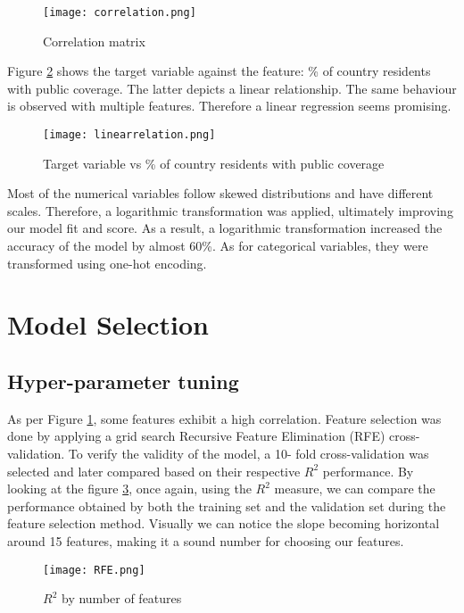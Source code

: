 \documentclass[twocolumn]{article}
\begin{document}
\begin{figure}[h]
    \centering
    \texttt{[image: correlation.png]}
    \caption{Correlation matrix}
    \label{fig:corr}
\end{figure}

Figure \ref{fig:linear} shows the target variable against the feature: \% of country residents with public coverage.  The latter depicts a linear relationship. The same behaviour is observed with multiple features. Therefore a linear regression seems promising.

\begin{figure}[h]
    \centering
    \texttt{[image: linearrelation.png]}
    \caption{Target variable vs \% of country residents with public coverage}
    \label{fig:linear}
\end{figure}

Most of the numerical variables follow skewed distributions and have different scales. Therefore, a logarithmic transformation was applied, ultimately improving our model fit and score. As a result, a logarithmic transformation increased the accuracy of the model by almost 60\%. As for categorical variables, they were transformed using one-hot encoding. 

\section{Model Selection}\label{secmodel}

\subsection{Hyper-parameter tuning} \label{secpar}
As per Figure \ref{fig:corr}, some features exhibit a high correlation. Feature selection was done by applying a grid search Recursive Feature Elimination (RFE) cross-validation. To verify the validity of the model, a 10- fold cross-validation was selected and later compared based on their respective $R^2$ performance. By looking at the figure \ref{fig:rfe}, once again, using the $R^2$ measure, we can compare the performance obtained by both the training set and the validation set during the feature selection method. Visually we can notice the slope becoming horizontal around 15 features, making it a sound number for choosing our features.


\begin{figure}[h]
    \centering
    \texttt{[image: RFE.png]}
    \caption{$R^2$ by number of features}
    \label{fig:rfe}
\end{figure}
\end{document}
